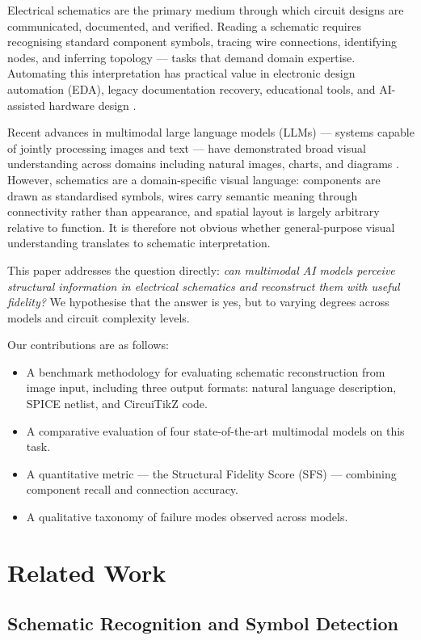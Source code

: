 \documentclass[conference]{IEEEtran}
\begin{document}
Electrical schematics are the primary medium through which circuit designs are communicated, documented, and verified. Reading a schematic requires recognising standard component symbols, tracing wire connections, identifying nodes, and inferring topology — tasks that demand domain expertise. Automating this interpretation has practical value in electronic design automation (EDA), legacy documentation recovery, educational tools, and AI-assisted hardware design \cite{b1}.

Recent advances in multimodal large language models (LLMs) — systems capable of jointly processing images and text — have demonstrated broad visual understanding across domains including natural images, charts, and diagrams \cite{b7}. However, schematics are a domain-specific visual language: components are drawn as standardised symbols, wires carry semantic meaning through connectivity rather than appearance, and spatial layout is largely arbitrary relative to function. It is therefore not obvious whether general-purpose visual understanding translates to schematic interpretation.

This paper addresses the question directly: \textit{can multimodal AI models perceive structural information in electrical schematics and reconstruct them with useful fidelity?} We hypothesise that the answer is yes, but to varying degrees across models and circuit complexity levels.

Our contributions are as follows:
\begin{itemize}
    \item A benchmark methodology for evaluating schematic reconstruction from image input, including three output formats: natural language description, SPICE netlist, and CircuiTikZ code.
    \item A comparative evaluation of four state-of-the-art multimodal models on this task.
    \item A quantitative metric — the Structural Fidelity Score (SFS) — combining component recall and connection accuracy.
    \item A qualitative taxonomy of failure modes observed across models.
\end{itemize}

\section{Related Work}

\subsection{Schematic Recognition and Symbol Detection}
\end{document}
